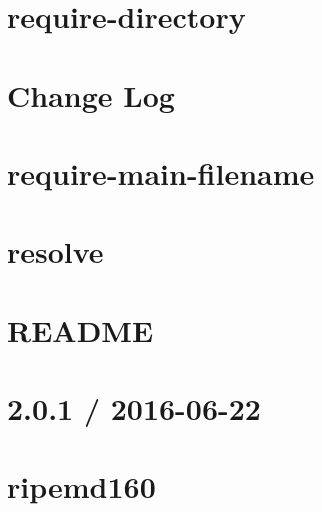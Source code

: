 \documentclass[twoside]{book}
\newcommand{\+}{\discretionary{\mbox{\scriptsize$\hookleftarrow$}}{}{}}
\begin{document}
\chapter{require-\/directory}
\label{md_dsmacc_examples_DRmerge_node_modules_require-directory_README}

\chapter{Change Log}
\label{md_dsmacc_examples_DRmerge_node_modules_require-main-filename_CHANGELOG}

\chapter{require-\/main-\/filename}
\label{md_dsmacc_examples_DRmerge_node_modules_require-main-filename_README}

\chapter{resolve}
\label{md_dsmacc_examples_DRmerge_node_modules_resolve_readme}

\chapter{R\+E\+A\+D\+ME}
\label{md_dsmacc_examples_DRmerge_node_modules_rimraf_README}

\chapter{2.0.1 / 2016-\/06-\/22}
\label{md_dsmacc_examples_DRmerge_node_modules_ripemd160_CHANGELOG}

\chapter{ripemd160}
\label{md_dsmacc_examples_DRmerge_node_modules_ripemd160_README}

\end{document}
